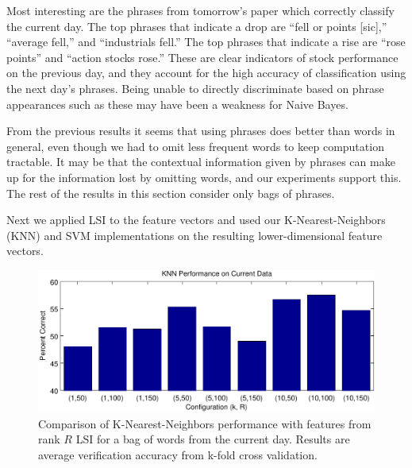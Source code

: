 \documentclass[10pt, twocolumn]{article}
\begin{document}
Most interesting are the phrases from tomorrow's paper which correctly classify the current day. The top phrases that indicate a drop are ``fell or points [sic],'' ``average fell,'' and ``industrials fell.'' The top phrases that indicate a rise are ``rose points'' and ``action stocks rose.'' These are clear indicators of stock performance on the previous day, and they account for the high accuracy of classification using the next day's phrases. Being unable to directly discriminate based on phrase appearances such as these may have been a weakness for Naive Bayes.


From the previous results it seems that using phrases does better than words in general, even though we had to omit less frequent words to keep computation tractable. It may be that the contextual information given by phrases can make up for the information lost by omitting words, and our experiments support this. The rest of the results in this section consider only bags of phrases.

Next we applied LSI to the feature vectors and used our K-Nearest-Neighbors (KNN) and SVM implementations on the resulting lower-dimensional feature vectors.

\begin{figure}[h]
\centering
\includegraphics[scale=0.5]{plots/knn-today.pdf}
\caption{Comparison of K-Nearest-Neighbors performance with features from rank $R$ LSI for a bag of words from the current day. Results are average verification accuracy from k-fold cross validation.}
\label{fig:knncompare}
\end{figure}
\end{document}

